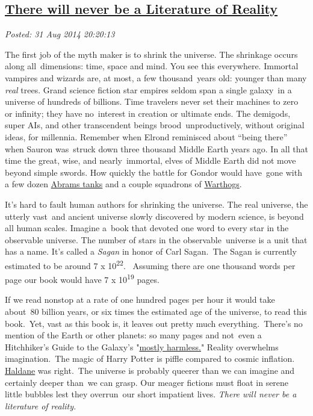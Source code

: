 %

\subsection*{\href{https://bakerjd99.wordpress.com/2014/08/31/there-will-never-be-a-literature-of-reality/}{There will never be a Literature of Reality}}


\noindent\emph{Posted: 31 Aug 2014 20:20:13}
\vspace{6pt}

The first job of the myth maker is to shrink the universe. The shrinkage
occurs along all~dimensions: time, space and mind. You see this
everywhere. Immortal vampires and wizards are, at most, a few
thousand~years old: younger than many \emph{real} trees. Grand science
fiction star empires seldom span a single galaxy~in a universe of
hundreds of billions. Time travelers never set their machines to zero or
infinity; they have no~interest in creation or ultimate ends. The
demigods, super AIs, and other transcendent beings
brood~unproductively, without original ideas, for millennia. Remember
when Elrond reminisced about ``being there'' when Sauron was~struck down
three thousand Middle Earth years ago. In all that time the great, wise,
and nearly~immortal, elves of Middle Earth did not move beyond simple
swords. How quickly the battle for Gondor would have~gone with a few
dozen
\href{http://www.marines.com/operating-forces/equipment/vehicles/m1a1-abrams-tank}{Abrams
tanks} and a couple squadrons of
\href{http://en.wikipedia.org/wiki/Fairchild_Republic_A-10_Thunderbolt_II}{Warthogs}.

It's hard to fault human authors for shrinking the universe. The real
universe, the utterly vast~and ancient universe slowly discovered by
modern science, is beyond all human scales. Imagine a~book that devoted
one word to every star in the observable universe. The number of stars
in the observable~universe is a unit that has a name. It's called a
\emph{Sagan} in honor of Carl Sagan.~The Sagan is currently estimated to
be around 7 x 10\textsuperscript{22}. ~Assuming there are one thousand
words per page our book would have 7 x 10\textsuperscript{19} pages.

If we read nonstop at a rate of one hundred pages per hour it would take
about~80 billion years, or six times the estimated age of the universe,
to read this book.~Yet, vast as this book is, it leaves out pretty much
everything.~There's no mention of the Earth or other planets: so many
pages and not~even a Hitchhiker's Guide to the Galaxy's
"\href{http://en.wikipedia.org/wiki/Mostly_Harmless}{mostly harmless.}"
Reality overwhelms imagination.~The magic of Harry Potter is piffle
compared to cosmic inflation.
\href{http://en.wikiquote.org/wiki/J._B._S._Haldane}{Haldane} was
right.~The universe is probably queerer than we can imagine and
certainly deeper than~we can grasp. Our meager fictions must float in
serene little bubbles lest they overrun~our short impatient lives.
\emph{There will never be a literature of reality.}



%